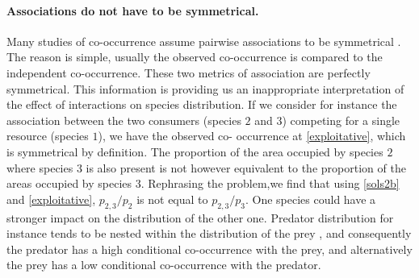 \paragraph*{Associations do not have to be symmetrical.} Many studies of co-occurrence assume pairwise associations to be symmetrical
\citep[but see][]{Araujo2011, Boulangeat2012}. The reason is simple, usually the observed
co-occurrence is compared to the independent co-occurrence. These two metrics
of association are perfectly symmetrical. This information is providing us an
inappropriate interpretation of the effect of interactions on species
distribution. If we consider for instance the association between the two
consumers (species $2$ and $3$) competing for a single resource (species $1$),
we have the observed co- occurrence at \eqref{exploitative}, which is
symmetrical by definition. The proportion of the area occupied by species $2$
where species $3$ is also present is not however equivalent to the proportion
of the areas occupied by species $3$. Rephrasing the problem,we find that
using \eqref{sols2b} and \eqref{exploitative}, $p_{2,3}/p_{2}$ is not equal to
$p_{2,3}/p_{3}$. One species could have a stronger impact on the distribution
of the other one. Predator distribution for instance tends to be
nested within the distribution of the prey \citep{Gravel2011}, and
consequently the predator has a high conditional co-occurrence with the prey,
and alternatively the prey has a low conditional co-occurrence with the
predator.

